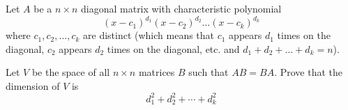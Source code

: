 Let $A$ be a $n\times n$ diagonal matrix with characteristic polynomial
$$(x-c_1)^{d_1}(x-c_2)^{d_2}\ldots (x-c_k)^{d_k}$$where $c_1, c_2, \ldots, c_k$ are distinct (which means that $c_1$ appears $d_1$ times on the diagonal, $c_2$ appears $d_2$ times on the diagonal, etc. and $d_1+d_2+\ldots + d_k=n$).

Let $V$ be the space of all $n\times n$ matrices $B$ such that $AB=BA$. Prove that the dimension of $V$ is
$$d_1^2+d_2^2+\cdots + d_k^2$$